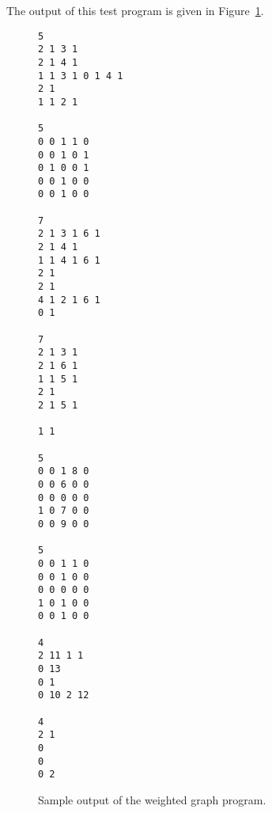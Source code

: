 The output of this test program is given in Figure~\ref{fig:wgraphoutput}.


\begin{figure}
\hspace*{.8in}\begin{minipage}{5in}
{\begin{verbatim}
5
2 1 3 1 
2 1 4 1 
1 1 3 1 0 1 4 1 
2 1 
1 1 2 1 

5
0 0 1 1 0 
0 0 1 0 1 
0 1 0 0 1 
0 0 1 0 0 
0 0 1 0 0 

7
2 1 3 1 6 1 
2 1 4 1 
1 1 4 1 6 1 
2 1 
2 1 
4 1 2 1 6 1 
0 1 

7
2 1 3 1 
2 1 6 1 
1 1 5 1 
2 1 
2 1 5 1 

1 1 

5
0 0 1 8 0 
0 0 6 0 0 
0 0 0 0 0 
1 0 7 0 0 
0 0 9 0 0 

5
0 0 1 1 0 
0 0 1 0 0 
0 0 0 0 0 
1 0 1 0 0 
0 0 1 0 0 

4
2 11 1 1 
0 13 
0 1 
0 10 2 12 

4
2 1 
0 
0 
0 2 
\end{verbatim}%
}
\end{minipage}
\caption{Sample output of the weighted graph  program.}
\label{fig:wgraphoutput}
\end{figure}
\fi
